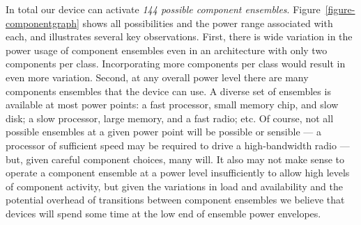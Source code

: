 In total our device can activate \textit{144 possible component ensembles}.
Figure~\ref{figure-componentgraph} shows all possibilities and the power
range associated with each, and illustrates several key observations. First,
there is wide variation in the power usage of component ensembles even in an
architecture with only two components per class. Incorporating more
components per class would result in even more variation. Second, at any
overall power level there are many components ensembles that the device can
use. A diverse set of ensembles is available at most power points: a fast
processor, small memory chip, and slow disk; a slow processor, large memory,
and a fast radio; etc. Of course, not all possible ensembles at a given power
point will be possible or sensible --- a processor of sufficient speed may be
required to drive a high-bandwidth radio --- but, given careful component
choices, many will. It also may not make sense to operate a component
ensemble at a power level insufficiently to allow high levels of component
activity, but given the variations in load and availability and the potential
overhead of transitions between component ensembles we believe that devices
will spend some time at the low end of ensemble power envelopes.

